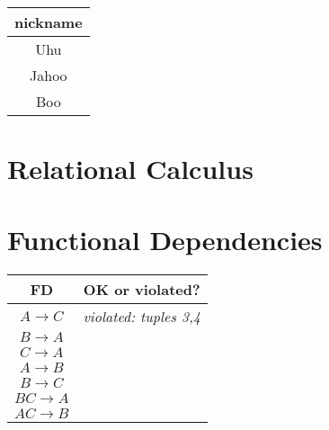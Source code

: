 \subsection{~}

\begin{tabular}{| c |}
\hline 
\textbf{nickname}\\
\hline
Uhu\\
\hline
Jahoo\\
\hline 
Boo\\
\hline
\end{tabular}

\section{Relational Calculus}

\section{Functional Dependencies}
\begin{tabular}{|c|c|}
\hline
\textbf{FD} & \textbf{OK or violated?} \\ \hline
$A \rightarrow C$ & \textit{violated: tuples 3,4} \\ \hline
$B \rightarrow A$ &  \\ \hline
$C \rightarrow A$ &  \\ \hline
$A \rightarrow B$ &  \\ \hline
$B \rightarrow C$ &  \\ \hline
$BC \rightarrow A$ &  \\ \hline
$AC \rightarrow B$ &  \\ \hline
\end{tabular}